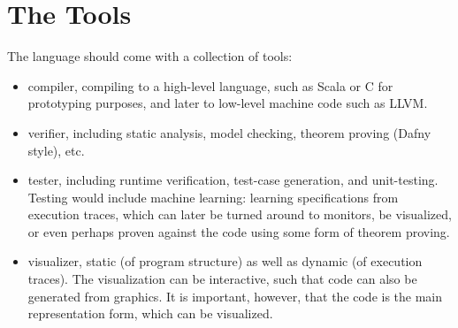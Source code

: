 \documentclass{llncs}
\begin{document}
\section{The Tools}

The language should come with a collection of tools:

\begin{itemize}

  \item compiler, compiling to a high-level
      language, such as Scala or C for prototyping 
      purposes, and later to low-level machine 
      code such as LLVM.  

  \item verifier, including static analysis, model 
    checking, theorem proving (Dafny style), etc.
    
  \item tester, including runtime verification, test-case
    generation, and unit-testing. Testing would include
    machine learning: learning specifications from execution
    traces, which can later be turned around to monitors, be
    visualized, or even perhaps proven against the code using
    some form of theorem proving.
    
  \item visualizer, static (of program structure) 
  as well as dynamic (of execution traces). The visualization can 
  be interactive, such that code can also be generated from graphics. 
  It is important, however, that the code is the main representation 
  form, which can be visualized.

\end{itemize}
 

%
%
\end{document}
